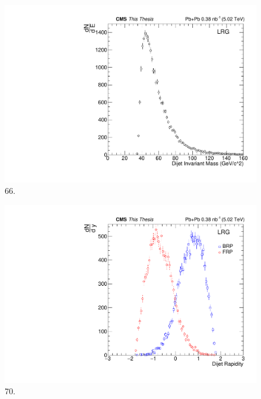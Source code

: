 \begin{figure}[h!]
\begin{centering}
\includegraphics[width=5in]{Chapter6/importfigs/66_thesis.pdf}
\par\end{centering}
\caption{66. \label{fig:66}}
\end{figure}

\begin{figure}[h!]
\begin{centering}
\includegraphics[width=5in]{Chapter6/importfigs/70_thesis.pdf}
\par\end{centering}
\caption{70. \label{fig:70}}
\end{figure}

